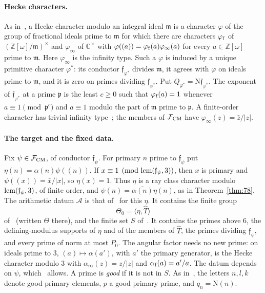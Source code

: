 \documentclass[11pt]{article}
\numberwithin{equation}{section}
\newcommand{\OO}{\mathbb Z[\omega]}
\newcommand{\N}{\mathrm N}
\begin{document}
\paragraph{Hecke characters.} As in~\cite[Ch.~VII, \S6]{Neukirch}, a Hecke character modulo an
integral ideal $\mathfrak m$ is a character $\varphi$ of the group of fractional ideals prime to
$\mathfrak m$ for which there are characters $\varphi_{\rm f}$ of $(\OO/\mathfrak m)^\times$ and
$\varphi_\infty$ of $\mathbb C^\times$ with $\varphi((a))=\varphi_{\rm f}(a)\varphi_\infty(a)$ for every
$a\in\OO$ prime to $\mathfrak m$. Here $\varphi_\infty$ is the infinity type. Such a $\varphi$ is
induced by a unique primitive character $\varphi^*$: its conductor $\mathfrak f_{\varphi^*}$ divides
$\mathfrak m$, it agrees with $\varphi$ on ideals prime to $\mathfrak m$, and it is zero on primes
dividing $\mathfrak f_{\varphi^*}$. Put $Q_{\varphi^*}=\N\mathfrak f_{\varphi^*}$. The exponent of
$\mathfrak f_{\varphi^*}$ at a prime $\mathfrak p$ is the least $c\ge0$ such that $\varphi_{\rm f}(a)=1$
whenever $a\equiv1\pmod{\mathfrak p^c}$ and $a\equiv1$ modulo the part of $\mathfrak m$ prime to
$\mathfrak p$. A finite-order character has trivial infinity type~\cite[proof of Lemma~4.8]{OAI78}; the
members of $\mathcal F_{\rm CM}$ have $\varphi_\infty(z)=\bar z/|z|$.

\paragraph{The target and the fixed data.} Fix $\psi\in\mathcal F_{\rm CM}$, of conductor
$\mathfrak f_\psi$. For primary $n$ prime to $\mathfrak f_\psi$ put $\eta(n)=\alpha(n)\psi((n))$. If
$x\equiv1\pmod{{\rm lcm}(\mathfrak f_\psi,3)}$, then $x$ is primary and $\psi((x))=\bar x/|x|$, so
$\eta(x)=1$. Thus $\eta$ is a ray class character modulo ${\rm lcm}(\mathfrak f_\psi,3)$, of finite
order, and $\psi(n)=\overline{\alpha(n)}\eta(n)$, as in Theorem~\ref{thm:78}. The arithmetic
datum $\mathcal A$ is that of~\cite[Section~4.1]{OAI78} for this $\eta$. It contains the finite
group
\begin{equation}\label{eq:d161}
 \Theta_0=\langle\eta,\widehat T\rangle
\end{equation}
of~\cite[Section~6.1]{OAI78} (written $\Theta$ there), and the finite set $S$ of~\cite[Section~6.1]{OAI78}.
It contains the primes above $6$, the defining-modulus supports of $\eta$ and of the members of
$\widehat T$, the primes dividing $\mathfrak f_\psi$, and every prime of norm at most $P_0$. The angular factor needs no new prime: on ideals prime to $3$,
$(a)\mapsto\alpha(a')$, with $a'$ the primary generator, is the Hecke character modulo $3$ with
$\alpha_\infty(z)=z/|z|$ and $\alpha_{\rm f}(a)=a'/a$. The datum depends on $\psi$, which~\cite[Section~4.1]{OAI78} allows. A prime is \emph{good} if it is not in $S$. As in~\cite[Section~4.1]{OAI78},
the letters $n,l,k$ denote good primary elements, $p$ a good primary prime, and $q_n=\N(n)$.
\end{document}
